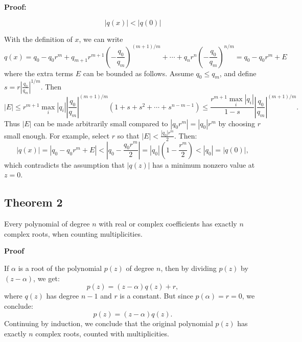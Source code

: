 \textbf{Proof:} 

\[|q(x)| < |q(0)|\]

With the definition of \(x\), we can write
\[
	q(x) = q_0 - q_0 r^m + q_{m+1} r^{m+1} {\left(-\frac{q_0}{q_m}\right)}^{(m+1)/m} + \cdots + q_n r^n {\left(-\frac{q_0}{q_m}\right)}^{n/m} = q_0 - q_0 r^m + E
\]
where the extra terms \(E\) can be bounded as follows. Assume \(q_0 \leq q_m\), and define \(s = r \left|\frac{q_0}{q_m}\right|^{1/m}\). Then
\[
	|E| \leq r^{m+1} \max_i |q_i| \left|\frac{q_0}{q_m}\right|^{(m+1)/m} (1 + s + s^2 + \cdots + s^{n - m - 1}) \leq \frac{r^{m+1} \max_i |q_i|}{1 - s} \left|\frac{q_0}{q_m}\right|^{(m+1)/m}.
\]
Thus \(|E|\) can be made arbitrarily small compared to \(|q_0 r^m| = |q_0| r^m\) by choosing \(r\) small enough. For example, select \(r\) so that \(|E| < \frac{|q_0| r^m}{2}\). Then:
\[
	|q(x)| = |q_0 - q_0 r^m + E| < |q_0 - \frac{q_0 r^m}{2}| = |q_0| \left(1 - \frac{r^m}{2}\right) < |q_0| = |q(0)|,
\]
which contradicts the assumption that \(|q(z)|\) has a minimum nonzero value at \(z = 0\).
\QED

\subsection{Theorem 2}
Every polynomial of degree \(n\) with real or complex coefficients has exactly \(n\) complex roots, when counting multiplicities.
\vspace{\baselineskip}

\textbf{Proof}

If \(\alpha\) is a root of the polynomial \(p(z)\) of degree \(n\), then by dividing \(p(z)\) by \((z - \alpha)\), we get:
\[
	p(z) = (z - \alpha) q(z) + r,
\]
where \(q(z)\) has degree \(n - 1\) and \(r\) is a constant. But since \(p(\alpha) = r = 0\), we conclude:
\[
	p(z) = (z - \alpha) q(z).
\]
Continuing by induction, we conclude that the original polynomial \(p(z)\) has exactly \(n\) complex roots, counted with multiplicities.

\QED
